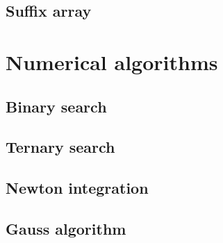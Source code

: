 \documentclass[12pt,a4paper]{article}
\begin{document}
\subsection{Suffix array}



\section{Numerical algorithms}

\subsection{Binary search}



\subsection{Ternary search}



\subsection{Newton integration}



\subsection{Gauss algorithm}


\end{document}
